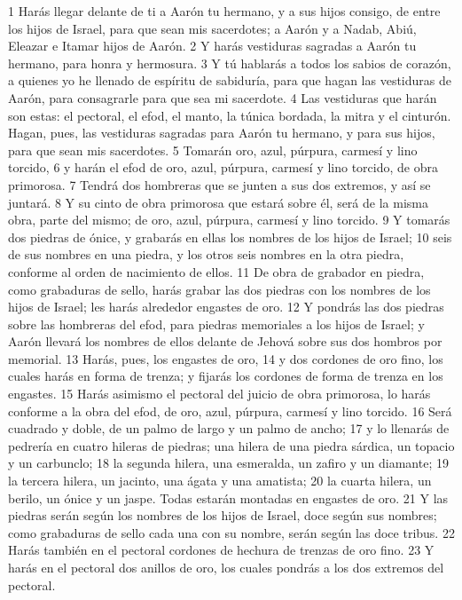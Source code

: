 1 Harás llegar delante de ti a Aarón tu hermano, y a sus hijos consigo, de entre los hijos de Israel, para que sean mis sacerdotes; a Aarón y a Nadab, Abiú, Eleazar e Itamar hijos de Aarón.
2 Y harás vestiduras sagradas a Aarón tu hermano, para honra y hermosura.
3 Y tú hablarás a todos los sabios de corazón, a quienes yo he llenado de espíritu de sabiduría, para que hagan las vestiduras de Aarón, para consagrarle para que sea mi sacerdote.
4 Las vestiduras que harán son estas: el pectoral, el efod, el manto, la túnica bordada, la mitra y el cinturón. Hagan, pues, las vestiduras sagradas para Aarón tu hermano, y para sus hijos, para que sean mis sacerdotes.
5 Tomarán oro, azul, púrpura, carmesí y lino torcido,
6 y harán el efod de oro, azul, púrpura, carmesí y lino torcido, de obra primorosa.
7 Tendrá dos hombreras que se junten a sus dos extremos, y así se juntará.
8 Y su cinto de obra primorosa que estará sobre él, será de la misma obra, parte del mismo; de oro, azul, púrpura, carmesí y lino torcido.
9 Y tomarás dos piedras de ónice, y grabarás en ellas los nombres de los hijos de Israel;
10 seis de sus nombres en una piedra, y los otros seis nombres en la otra piedra, conforme al orden de nacimiento de ellos.
11 De obra de grabador en piedra, como grabaduras de sello, harás grabar las dos piedras con los nombres de los hijos de Israel; les harás alrededor engastes de oro.
12 Y pondrás las dos piedras sobre las hombreras del efod, para piedras memoriales a los hijos de Israel; y Aarón llevará los nombres de ellos delante de Jehová sobre sus dos hombros por memorial.
13 Harás, pues, los engastes de oro,
14 y dos cordones de oro fino, los cuales harás en forma de trenza; y fijarás los cordones de forma de trenza en los engastes.
15 Harás asimismo el pectoral del juicio de obra primorosa, lo harás conforme a la obra del efod, de oro, azul, púrpura, carmesí y lino torcido.
16 Será cuadrado y doble, de un palmo   de largo y un palmo de ancho;
17 y lo llenarás de pedrería en cuatro hileras de piedras; una hilera de una piedra sárdica, un topacio y un carbunclo;
18 la segunda hilera, una esmeralda, un zafiro y un diamante;
19 la tercera hilera, un jacinto, una ágata y una amatista;
20 la cuarta hilera, un berilo, un ónice y un jaspe. Todas estarán montadas en engastes de oro.
21 Y las piedras serán según los nombres de los hijos de Israel, doce según sus nombres; como grabaduras de sello cada una con su nombre, serán según las doce tribus.
22 Harás también en el pectoral cordones de hechura de trenzas de oro fino.
23 Y harás en el pectoral dos anillos de oro, los cuales pondrás a los dos extremos del pectoral.
